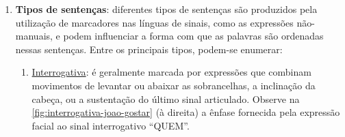 \begin{enumerate}



    \item \textbf{Tipos de sentenças}: diferentes tipos de sentenças são produzidos pela utilização de marcadores nas línguas de sinais, como as expressões não-manuais, e podem influenciar a forma com que as palavras são ordenadas nessas sentenças.
          Entre os principais tipos, podem-se enumerar:



          \begin{enumerate}
              \item \underline{Interrogativa}: é geralmente marcada por expressões que combinam movimentos de levantar ou abaixar as sobrancelhas, a inclinação da cabeça, ou a sustentação do último sinal articulado.
                    Observe na \autoref{fig:interrogativa-joao-gostar} (à direita) a ênfase fornecida pela expressão facial ao sinal interrogativo ``QUEM''.


\end{enumerate}
\end{enumerate}
